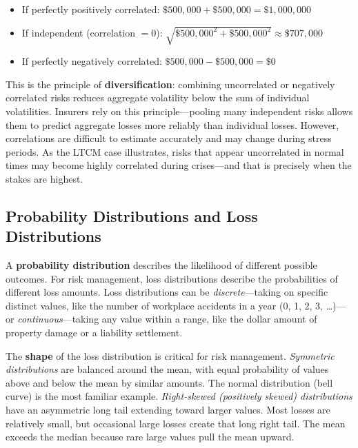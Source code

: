 \documentclass[11pt,openany]{book}
\begin{document}
\begin{itemize}
  \item If perfectly positively correlated: \(\$500{,}000 + \$500{,}000 = \$1{,}000{,}000\)
  \item If independent (correlation \(= 0\)):
        \(\sqrt{\$500{,}000^2 + \$500{,}000^2} \approx \$707{,}000\)
  \item If perfectly negatively correlated:
        \(\$500{,}000 - \$500{,}000 = \$0\)
\end{itemize}

This is the principle of \textbf{diversification}: combining uncorrelated or
negatively correlated risks reduces aggregate volatility below the sum of
individual volatilities. Insurers rely on this principle---pooling many
independent risks allows them to predict aggregate losses more reliably than
individual losses. However, correlations are difficult to estimate accurately
and may change during stress periods. As the LTCM case illustrates, risks that
appear uncorrelated in normal times may become highly correlated during
crises---and that is precisely when the stakes are highest.

\subsection{Probability Distributions and Loss Distributions}
\label{subsec:loss-distributions}

A \textbf{probability distribution} describes the likelihood of different
possible outcomes. For risk management, loss distributions describe the
probabilities of different loss amounts. Loss distributions can be
\emph{discrete}---taking on specific distinct values, like the number of
workplace accidents in a year (0, 1, 2, 3, \ldots)---or
\emph{continuous}---taking any value within a range, like the dollar amount of
property damage or a liability settlement.

The \textbf{shape} of the loss distribution is critical for risk management.
\emph{Symmetric distributions} are balanced around the mean, with equal
probability of values above and below the mean by similar amounts. The normal
distribution (bell curve) is the most familiar example. \emph{Right-skewed
(positively skewed) distributions} have an asymmetric long tail extending toward
larger values. Most losses are relatively small, but occasional large losses
create that long right tail. The mean exceeds the median because rare large
values pull the mean upward.
\end{document}
